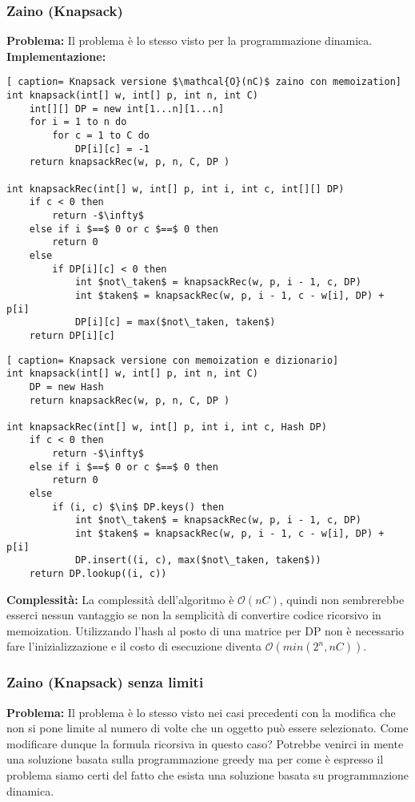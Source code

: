 \documentclass[../cheatSheetAlgoritmi.tex]{subfiles}
\begin{document}
\subsubsection{Zaino (Knapsack)}
\textbf{Problema:} Il problema è lo stesso visto per la programmazione dinamica. \\
\textbf{Implementazione:}
\begin{lstlisting}[ caption= Knapsack versione $\mathcal{O}(nC)$ zaino con memoization]
int knapsack(int[] w, int[] p, int n, int C)
	int[][] DP = new int[1...n][1...n]
	for i = 1 to n do
		for c = 1 to C do
			DP[i][c] = -1
	return knapsackRec(w, p, n, C, DP )
	
int knapsackRec(int[] w, int[] p, int i, int c, int[][] DP)
	if c < 0 then
		return -$\infty$
	else if i $==$ 0 or c $==$ 0 then
		return 0
	else 
		if DP[i][c] < 0 then 
			int $not\_taken$ = knapsackRec(w, p, i - 1, c, DP)
			int $taken$ = knapsackRec(w, p, i - 1, c - w[i], DP) + p[i]
			DP[i][c] = max($not\_taken, taken$)
	return DP[i][c]
\end{lstlisting}
\begin{lstlisting}[ caption= Knapsack versione con memoization e dizionario]
int knapsack(int[] w, int[] p, int n, int C)
	DP = new Hash
	return knapsackRec(w, p, n, C, DP )
	
int knapsackRec(int[] w, int[] p, int i, int c, Hash DP)
	if c < 0 then
		return -$\infty$
	else if i $==$ 0 or c $==$ 0 then
		return 0
	else 
		if (i, c) $\in$ DP.keys() then 
			int $not\_taken$ = knapsackRec(w, p, i - 1, c, DP)
			int $taken$ = knapsackRec(w, p, i - 1, c - w[i], DP) + p[i]
			DP.insert((i, c), max($not\_taken, taken$))
	return DP.lookup((i, c))
\end{lstlisting}
\textbf{Complessità:} La complessità dell'algoritmo è $\mathcal{O}(nC)$, quindi non sembrerebbe esserci nessun vantaggio se non la semplicità di convertire codice ricorsivo in memoization. Utilizzando l'hash al posto di una matrice per DP non è necessario fare l'inizializzazione e il costo di esecuzione diventa $\mathcal{O}( min (2^{n}, nC))$.
\newpage
\subsubsection{Zaino (Knapsack) senza limiti}
\textbf{Problema:} Il problema è lo stesso visto nei casi precedenti con la modifica che non si pone limite al numero di volte che un oggetto può essere selezionato. Come modificare dunque la formula ricorsiva in questo caso? Potrebbe venirci in mente una soluzione basata sulla programmazione greedy ma per come è espresso il problema siamo certi del fatto che esista una soluzione basata su programmazione dinamica.
\end{document}
